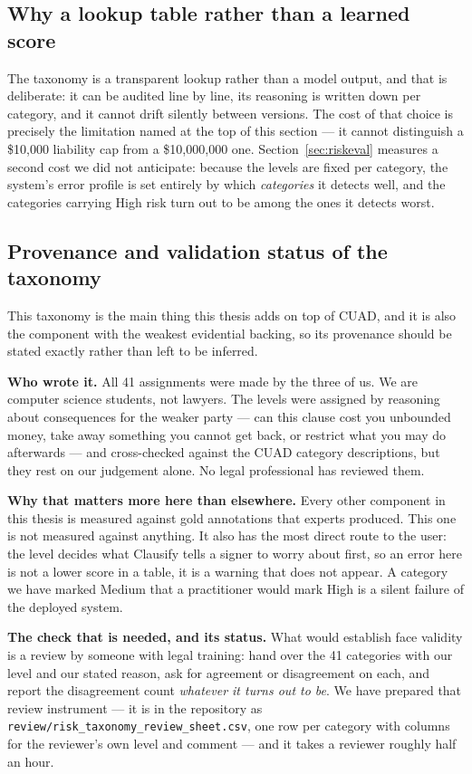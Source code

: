 \subsection{Why a lookup table rather than a learned score}
The taxonomy is a transparent lookup rather than a model output, and that is deliberate: it can be audited line by line, its reasoning is written down per category, and it cannot drift silently between versions. The cost of that choice is precisely the limitation named at the top of this section --- it cannot distinguish a \$10{,}000 liability cap from a \$10{,}000{,}000 one. Section~\ref{sec:riskeval} measures a second cost we did not anticipate: because the levels are fixed per category, the system's error profile is set entirely by which \emph{categories} it detects well, and the categories carrying High risk turn out to be among the ones it detects worst.


\subsection{Provenance and validation status of the taxonomy}
\label{sec:taxvalid}
This taxonomy is the main thing this thesis adds on top of CUAD, and it is also the component with the weakest evidential backing, so its provenance should be stated exactly rather than left to be inferred.

\textbf{Who wrote it.} All 41 assignments were made by the three of us. We are computer science students, not lawyers. The levels were assigned by reasoning about consequences for the weaker party --- can this clause cost you unbounded money, take away something you cannot get back, or restrict what you may do afterwards --- and cross-checked against the CUAD category descriptions, but they rest on our judgement alone. No legal professional has reviewed them.

\textbf{Why that matters more here than elsewhere.} Every other component in this thesis is measured against gold annotations that experts produced. This one is not measured against anything. It also has the most direct route to the user: the level decides what Clausify tells a signer to worry about first, so an error here is not a lower score in a table, it is a warning that does not appear. A category we have marked Medium that a practitioner would mark High is a silent failure of the deployed system.

\textbf{The check that is needed, and its status.} What would establish face validity is a review by someone with legal training: hand over the 41 categories with our level and our stated reason, ask for agreement or disagreement on each, and report the disagreement count \emph{whatever it turns out to be}. We have prepared that review instrument --- it is in the repository as \texttt{review/risk\_taxonomy\_review\_sheet.csv}, one row per category with columns for the reviewer's own level and comment --- and it takes a reviewer roughly half an hour.

